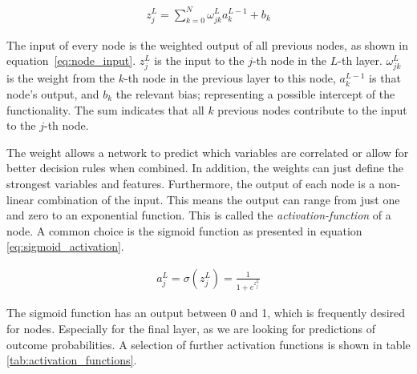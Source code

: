 \begin{align}
    z_j^L = \sum_{k=0}^{N} \omega_{jk}^L a_k^{L-1} + b_k
    \label{eq:node_input}
\end{align}

The input of every node is the weighted output of all previous nodes, as shown in equation~\eqref{eq:node_input}. $z_j^L$ is the input to the $j$-th node in the $L$-th layer. $\omega_{jk}^L$ is the weight from the $k$-th node in the previous layer to this node, $a_k^{L-1}$ is that node's output, and $b_k$ the relevant bias; representing a possible intercept of the functionality. The sum indicates that all $k$ previous nodes contribute to the input to the $j$-th node.


The weight allows a network to predict which variables are correlated or allow for better decision rules when combined. In addition, the weights can just define the strongest variables and features. Furthermore, the output of each node is a non-linear combination of the input. This means the output can range from just one and zero to an exponential function. This is called the \emph{activation-function} of a node. A common choice is the sigmoid function as presented in equation \eqref{eq:sigmoid_activation}.~\cite{chollet2015keras}

\begin{align}
    a_j^L = \sigma ( z_j^L ) = \frac{1}{1 + e^{z_j^L}}
    \label{eq:sigmoid_activation}
\end{align}

The sigmoid function has an output between \num{0} and \num{1}, which is frequently desired for nodes. Especially for the final layer, as we are looking for predictions of outcome probabilities. A selection of further activation functions is shown in table \ref{tab:activation_functions}.

